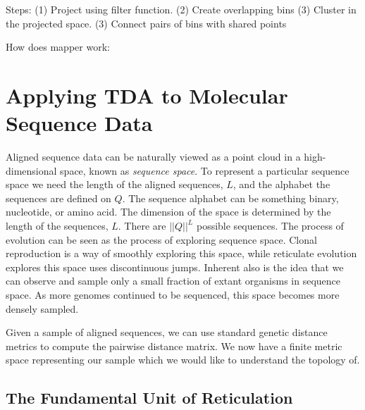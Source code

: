 Steps:
(1) Project using filter function.
(2) Create overlapping bins
(3) Cluster in the projected space.
(3) Connect pairs of bins with shared points



How does mapper work:

\section{Applying TDA to Molecular Sequence Data}

Aligned sequence data can be naturally viewed as a point cloud in a high-dimensional space, known as \emph{sequence space}.
To represent a particular sequence space we need the length of the aligned sequences, $L$, and the alphabet the sequences are defined on $Q$.
The sequence alphabet can be something binary, nucleotide, or amino acid.
The dimension of the space is determined by the length of the sequences, $L$.
There are $||Q||^L$ possible sequences.
The process of evolution can be seen as the process of exploring sequence space.
Clonal reproduction is a way of smoothly exploring this space, while reticulate evolution explores this space uses discontinuous jumps.
Inherent also is the idea that we can observe and sample only a small fraction of extant organisms in sequence space.
As more genomes continued to be sequenced, this space becomes more densely sampled.

Given a sample of aligned sequences, we can use standard genetic distance metrics to compute the pairwise distance matrix.
We now have a finite metric space representing our sample which we would like to understand the topology of.

\subsection{The Fundamental Unit of Reticulation}































